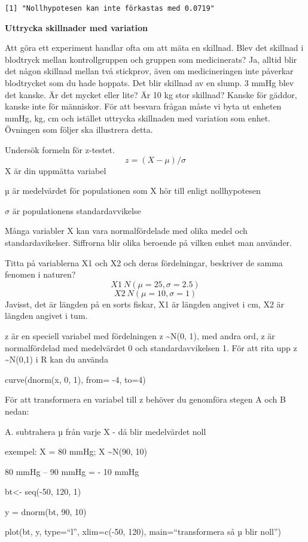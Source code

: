 \documentclass[
  letterpaper,
  DIV=11,
  numbers=noendperiod]{scrartcl}
\begin{document}
\begin{verbatim}
[1] "Nollhypotesen kan inte förkastas med 0.0719"
\end{verbatim}

\textbf{Uttrycka skillnader med variation}

Att göra ett experiment handlar ofta om att mäta en skillnad. Blev det
skillnad i blodtryck mellan kontrollgruppen och gruppen som
medicinerats? Ja, alltid blir det någon skillnad mellan två stickprov,
även om medicineringen inte påverkar blodtrycket som du hade hoppats.
Det blir skillnad av en slump. 3 mmHg blev det kanske. Är det mycket
eller lite? Är 10 kg stor skillnad? Kanske för gäddor, kanske inte för
människor. För att besvara frågan måste vi byta ut enheten mmHg, kg, cm
och istället uttrycka skillnaden med variation som enhet. Övningen som
följer ska illustrera detta.

Undersök formeln för z-testet. \[
z = (X-\mu)/σ
\] X är din uppmätta variabel

\(µ\) är medelvärdet för populationen som X hör till enligt
nollhypotesen

\(σ\) är populationens standardavvikelse

Många variabler X kan vara normalfördelade med olika medel och
standardavikelser. Siffrorna blir olika beroende på vilken enhet man
använder.

Titta på variablerna X1 och X2 och deras fördelningar, beskriver de
samma fenomen i naturen? \[
X1 ~ N(\mu = 25 , \sigma = 2.5)
\] \[
X2 ~ N(\mu = 10, \sigma = 1)
\] Javisst, det är längden på en sorts fiskar, X1 är längden angivet i
cm, X2 är längden angivet i tum.

z är en speciell variabel med fördelningen z \textasciitilde N(0, 1),
med andra ord, z är normalfördelad med medelvärdet 0 och
standardavvikelsen 1. För att rita upp z \textasciitilde N(0,1) i R kan
du använda

curve(dnorm(x, 0, 1), from= -4, to=4)

För att transformera en variabel till z behöver du genomföra stegen A
och B nedan:

A. subtrahera µ från varje X - då blir medelvärdet noll

exempel: X = 80 mmHg; X \textasciitilde N(90, 10)

80 mmHg -- 90 mmHg = - 10 mmHg

bt\textless- seq(-50, 120, 1)

y = dnorm(bt, 90, 10)

plot(bt, y, type=``l'', xlim=c(-50, 120), main=``transformera så µ blir
noll'')
\end{document}
